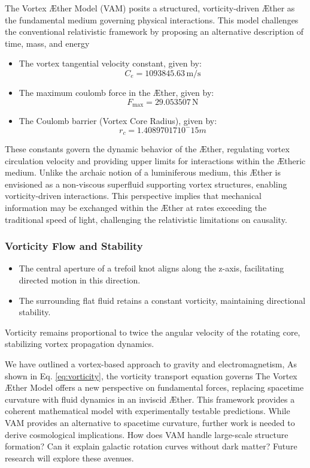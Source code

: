 The Vortex Æther Model (VAM) posits a structured, vorticity-driven Æther as the fundamental medium governing physical interactions.
This model challenges the conventional relativistic framework by proposing an alternative description of time, mass, and energy



\begin{itemize}
    \item The vortex tangential velocity constant, given by: \[C_e = 1093845.63 \, \mathrm{m/s}\]
    \item The maximum coulomb force in the Æther, given by:\[F_\text{max} = 29.053507 \, \mathrm{N}\]
    \item The Coulomb barrier (Vortex Core Radius), given by: \[r_c = 1.40897017 10^-15 m\]
\end{itemize}

These constants govern the dynamic behavior of the Æther, regulating vortex circulation velocity and providing upper limits for interactions within the Ætheric medium.
Unlike the archaic notion of a luminiferous medium, this Æther is envisioned as a non-viscous superfluid supporting vortex structures, enabling vorticity-driven interactions.
This perspective implies that mechanical information may be exchanged within the Æther at rates exceeding the traditional speed of light, challenging the relativistic limitations on causality.


\subsubsection*{Vorticity Flow and Stability}

\begin{itemize}
    \item The central aperture of a trefoil knot aligns along the z-axis, facilitating directed motion in this direction.
    \item The surrounding flat fluid retains a constant vorticity, maintaining directional stability.
\end{itemize}
Vorticity remains proportional to twice the angular velocity of the rotating core, stabilizing vortex propagation dynamics.

We have outlined a vortex-based approach to gravity and electromagnetism, As shown in Eq. \eqref{eq:vorticity}, the vorticity transport equation governs  The Vortex Æther Model offers a new perspective on fundamental forces,
replacing spacetime curvature with fluid dynamics in an inviscid Æther.
This framework provides a coherent mathematical model with experimentally testable predictions.
While VAM provides an alternative to spacetime curvature, further work is needed to derive cosmological implications.
How does VAM handle large-scale structure formation?
Can it explain galactic rotation curves without dark matter?
Future research will explore these avenues.


